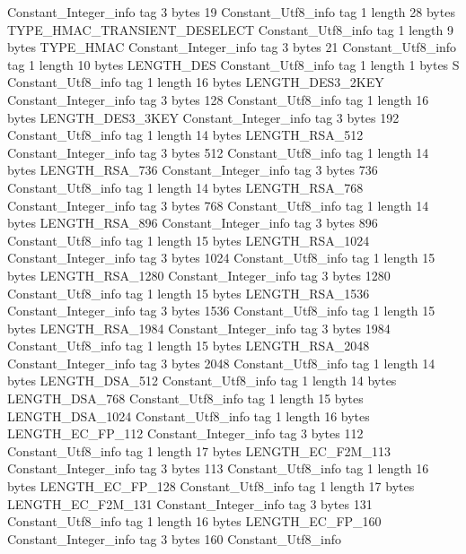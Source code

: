 {{		Constant_Integer_info {
			tag	3
			bytes	19
		}
		Constant_Utf8_info {
			tag	1
			length	28
			bytes	TYPE_HMAC_TRANSIENT_DESELECT
		}
		Constant_Utf8_info {
			tag	1
			length	9
			bytes	TYPE_HMAC
		}
		Constant_Integer_info {
			tag	3
			bytes	21
		}
		Constant_Utf8_info {
			tag	1
			length	10
			bytes	LENGTH_DES
		}
		Constant_Utf8_info {
			tag	1
			length	1
			bytes	S
		}
		Constant_Utf8_info {
			tag	1
			length	16
			bytes	LENGTH_DES3_2KEY
		}
		Constant_Integer_info {
			tag	3
			bytes	128
		}
		Constant_Utf8_info {
			tag	1
			length	16
			bytes	LENGTH_DES3_3KEY
		}
		Constant_Integer_info {
			tag	3
			bytes	192
		}
		Constant_Utf8_info {
			tag	1
			length	14
			bytes	LENGTH_RSA_512
		}
		Constant_Integer_info {
			tag	3
			bytes	512
		}
		Constant_Utf8_info {
			tag	1
			length	14
			bytes	LENGTH_RSA_736
		}
		Constant_Integer_info {
			tag	3
			bytes	736
		}
		Constant_Utf8_info {
			tag	1
			length	14
			bytes	LENGTH_RSA_768
		}
		Constant_Integer_info {
			tag	3
			bytes	768
		}
		Constant_Utf8_info {
			tag	1
			length	14
			bytes	LENGTH_RSA_896
		}
		Constant_Integer_info {
			tag	3
			bytes	896
		}
		Constant_Utf8_info {
			tag	1
			length	15
			bytes	LENGTH_RSA_1024
		}
		Constant_Integer_info {
			tag	3
			bytes	1024
		}
		Constant_Utf8_info {
			tag	1
			length	15
			bytes	LENGTH_RSA_1280
		}
		Constant_Integer_info {
			tag	3
			bytes	1280
		}
		Constant_Utf8_info {
			tag	1
			length	15
			bytes	LENGTH_RSA_1536
		}
		Constant_Integer_info {
			tag	3
			bytes	1536
		}
		Constant_Utf8_info {
			tag	1
			length	15
			bytes	LENGTH_RSA_1984
		}
		Constant_Integer_info {
			tag	3
			bytes	1984
		}
		Constant_Utf8_info {
			tag	1
			length	15
			bytes	LENGTH_RSA_2048
		}
		Constant_Integer_info {
			tag	3
			bytes	2048
		}
		Constant_Utf8_info {
			tag	1
			length	14
			bytes	LENGTH_DSA_512
		}
		Constant_Utf8_info {
			tag	1
			length	14
			bytes	LENGTH_DSA_768
		}
		Constant_Utf8_info {
			tag	1
			length	15
			bytes	LENGTH_DSA_1024
		}
		Constant_Utf8_info {
			tag	1
			length	16
			bytes	LENGTH_EC_FP_112
		}
		Constant_Integer_info {
			tag	3
			bytes	112
		}
		Constant_Utf8_info {
			tag	1
			length	17
			bytes	LENGTH_EC_F2M_113
		}
		Constant_Integer_info {
			tag	3
			bytes	113
		}
		Constant_Utf8_info {
			tag	1
			length	16
			bytes	LENGTH_EC_FP_128
		}
		Constant_Utf8_info {
			tag	1
			length	17
			bytes	LENGTH_EC_F2M_131
		}
		Constant_Integer_info {
			tag	3
			bytes	131
		}
		Constant_Utf8_info {
			tag	1
			length	16
			bytes	LENGTH_EC_FP_160
		}
		Constant_Integer_info {
			tag	3
			bytes	160
		}
		Constant_Utf8_info {
}}}
